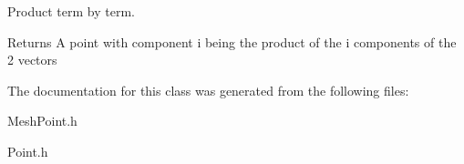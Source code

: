 Product term by term. 

\begin{DoxyReturn}{Returns}
A point with component i being the product of the i components of the 2 vectors 
\end{DoxyReturn}


The documentation for this class was generated from the following files\+:\begin{DoxyCompactItemize}
\item 
Mesh\+Point.\+h\item 
Point.\+h\end{DoxyCompactItemize}
